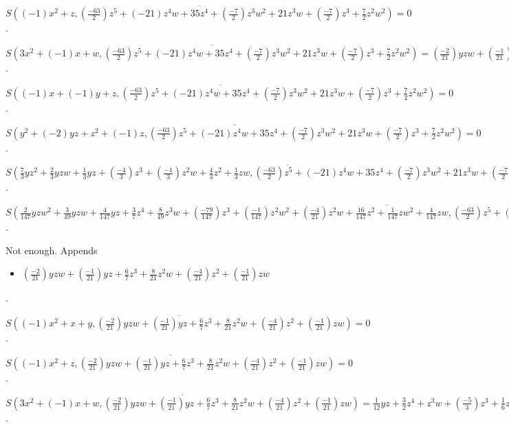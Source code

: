 $\overline{S((-1)x^{2}+z, (\frac{-63}{2})z^{5}+(-21)z^{4}w+35z^{4}+(\frac{-7}{2})z^{3}w^{2}+21z^{3}w+(\frac{-7}{2})z^{3}+\frac{7}{2}z^{2}w^{2})} = 0$.

$\overline{S(3x^{2}+(-1)x+w, (\frac{-63}{2})z^{5}+(-21)z^{4}w+35z^{4}+(\frac{-7}{2})z^{3}w^{2}+21z^{3}w+(\frac{-7}{2})z^{3}+\frac{7}{2}z^{2}w^{2})} = (\frac{-2}{21})yzw+(\frac{-1}{21})yz+\frac{6}{7}z^{3}+\frac{8}{21}z^{2}w+(\frac{-4}{21})z^{2}+(\frac{-1}{21})zw$.

$\overline{S((-1)x+(-1)y+z, (\frac{-63}{2})z^{5}+(-21)z^{4}w+35z^{4}+(\frac{-7}{2})z^{3}w^{2}+21z^{3}w+(\frac{-7}{2})z^{3}+\frac{7}{2}z^{2}w^{2})} = 0$.

$\overline{S(y^{2}+(-2)yz+z^{2}+(-1)z, (\frac{-63}{2})z^{5}+(-21)z^{4}w+35z^{4}+(\frac{-7}{2})z^{3}w^{2}+21z^{3}w+(\frac{-7}{2})z^{3}+\frac{7}{2}z^{2}w^{2})} = 0$.

$\overline{S(\frac{7}{3}yz^{2}+\frac{2}{3}yzw+\frac{1}{3}yz+(\frac{-4}{3})z^{3}+(\frac{-1}{3})z^{2}w+\frac{4}{3}z^{2}+\frac{1}{3}zw, (\frac{-63}{2})z^{5}+(-21)z^{4}w+35z^{4}+(\frac{-7}{2})z^{3}w^{2}+21z^{3}w+(\frac{-7}{2})z^{3}+\frac{7}{2}z^{2}w^{2})} = 0$.

$\overline{S(\frac{2}{147}yzw^{2}+\frac{3}{49}yzw+\frac{4}{147}yz+\frac{3}{7}z^{4}+\frac{8}{49}z^{3}w+(\frac{-79}{147})z^{3}+(\frac{-1}{147})z^{2}w^{2}+(\frac{-4}{21})z^{2}w+\frac{16}{147}z^{2}+\frac{1}{147}zw^{2}+\frac{4}{147}zw, (\frac{-63}{2})z^{5}+(-21)z^{4}w+35z^{4}+(\frac{-7}{2})z^{3}w^{2}+21z^{3}w+(\frac{-7}{2})z^{3}+\frac{7}{2}z^{2}w^{2})} = 0$.

Not enough.  Appends \begin{itemize}
\item $(\frac{-2}{21})yzw+(\frac{-1}{21})yz+\frac{6}{7}z^{3}+\frac{8}{21}z^{2}w+(\frac{-4}{21})z^{2}+(\frac{-1}{21})zw$
\end{itemize}  .


$\overline{S((-1)x^{2}+x+y, (\frac{-2}{21})yzw+(\frac{-1}{21})yz+\frac{6}{7}z^{3}+\frac{8}{21}z^{2}w+(\frac{-4}{21})z^{2}+(\frac{-1}{21})zw)} = 0$.

$\overline{S((-1)x^{2}+z, (\frac{-2}{21})yzw+(\frac{-1}{21})yz+\frac{6}{7}z^{3}+\frac{8}{21}z^{2}w+(\frac{-4}{21})z^{2}+(\frac{-1}{21})zw)} = 0$.

$\overline{S(3x^{2}+(-1)x+w, (\frac{-2}{21})yzw+(\frac{-1}{21})yz+\frac{6}{7}z^{3}+\frac{8}{21}z^{2}w+(\frac{-4}{21})z^{2}+(\frac{-1}{21})zw)} = \frac{1}{12}yz+\frac{3}{2}z^{4}+z^{3}w+(\frac{-5}{3})z^{3}+\frac{1}{6}z^{2}w^{2}+(-1)z^{2}w+\frac{1}{3}z^{2}+(\frac{-1}{6})zw^{2}+\frac{1}{12}zw$.

